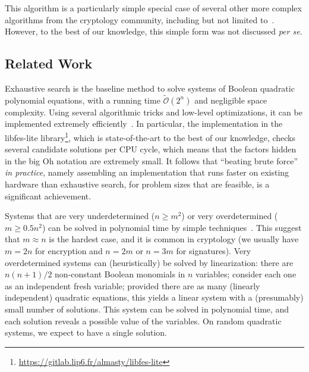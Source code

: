 \documentclass[twoside,leqno]{article}
\newcommand{\bigOsoft}[1]{\ensuremath{\mathcal{\tilde O}\left( #1 \right)} }
\begin{document}
This algorithm is a particularly simple special case of several other more
complex algorithms from the cryptology community, including but not limited
to~\cite{CourtoisKPS00,BettaleFP09,BardetFSS13,JouxV17}. However, to the best of
our knowledge, this simple form was not discussed \textit{per se}.


\subsection*{Related Work}
\label{sec:related}

Exhaustive search is the baseline method to solve systems of Boolean quadratic
polynomial equations, with a running time $\bigOsoft{2^n}$ and negligible space
complexity. Using several algorithmic tricks and low-level optimizations, it can
be implemented extremely efficiently~\cite{BouillaguetCCCNSY10}. In particular,
the implementation in the \textsf{libfes-lite}
library\footnote{\url{https://gitlab.lip6.fr/almasty/libfes-lite}}, which is
state-of-the-art to the best of our knowledge, checks several candidate
solutions per CPU cycle, which means that the factors hidden in the big Oh
notation are extremely small. It follows that ``beating brute force'' \emph{in
  practice}, namely assembling an implementation that runs faster on existing
hardware than exhaustive search, for problem sizes that are feasible, is a
significant achievement.

Systems that are very underdetermined ($n \geq m^2$) or very overdetermined
($m \geq 0.5 n^2$) can be solved in polynomial time by simple
techniques~\cite{CourtoisGMT02}. This suggest that $m \approx n$ is the hardest
case, and it is common in cryptology (we usually have $m=2n$ for encryption and
$n = 2m$ or $n=3m$ for signatures). Very overdetermined systems can
(heuristically) be solved by linearization: there are $n(n+1)/2$ non-constant
Boolean monomials in $n$ variables; consider each one as an independent fresh
variable; provided there are as many (linearly independent) quadratic equations,
this yields a linear system with a (presumably) small number of solutions. This
system can be solved in polynomial time, and each solution reveals a possible
value of the variables. On random quadratic systems, we expect to have a single
solution.
\end{document}
